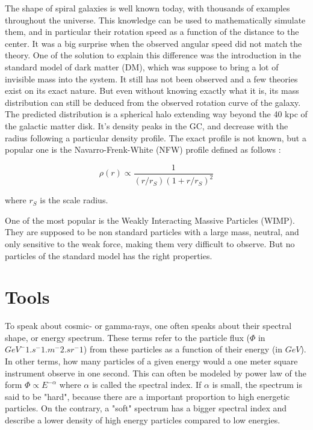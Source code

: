 The shape of spiral galaxies is well known today, with thousands of examples throughout the universe. This knowledge can be used to mathematically simulate them, and in particular their rotation speed as a function of the distance to the center. It was a big surprise when the observed angular speed did not match the theory. One of the solution to explain this difference was the introduction in the standard model of dark matter (DM), which was suppose to bring a lot of invisible mass into the system. It still has not been observed and a few theories exist on its exact nature. But even without knowing exactly what it is, its mass distribution can still be deduced from the observed rotation curve of the galaxy. The predicted distribution is a spherical halo extending way beyond the 40 kpc of the galactic matter disk. It's density peaks in the GC, and decrease with the radius following a particular density profile. The exact profile is not known, but a popular one is the Navarro-Frenk-White (NFW) profile defined as follows :

\begin{equation}
\rho (r) \propto \frac{1}{\left( r/r_S \right) \left( 1 + r/r_S \right)^2 }
\end{equation}

where $r_S$ is the scale radius.

One of the most popular is the Weakly Interacting Massive Particles (WIMP). They are supposed to be non standard particles with a large mass, neutral, and only sensitive to the weak force, making them very difficult to observe. But no particles of the standard model has the right properties. 


\section{Tools}

To speak about cosmic- or gamma-rays, one often speaks about their spectral shape, or energy spectrum. These terms refer to the particle flux ($\Phi$ in $GeV^-1.s^-1.m^-2.sr^-1$) from these particles as a function of their energy (in $GeV$).  In other terms, how many particles of a given energy would a one meter square instrument observe in one second. This can often be modeled by power law of the form $\Phi \propto E^{-\alpha}$  where $\alpha$ is called the spectral index. If $\alpha$ is small, the spectrum is said to be "hard", because there are a important proportion to high energetic particles. On the contrary, a "soft" spectrum has a bigger spectral index and describe a lower density of high energy particles compared to low energies.

